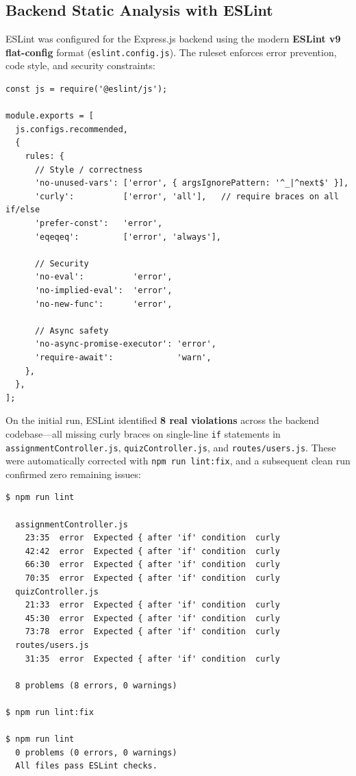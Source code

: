 \documentclass[12pt, a4paper]{report}
\begin{document}
\subsection{Backend Static Analysis with ESLint}
ESLint was configured for the Express.js backend using the modern \textbf{ESLint v9 flat-config} format (\texttt{eslint.config.js}). The ruleset enforces error prevention, code style, and security constraints:

\begin{lstlisting}[style=js_style, caption={Backend ESLint flat configuration (\texttt{backend/eslint.config.js})}]
const js = require('@eslint/js');

module.exports = [
  js.configs.recommended,
  {
    rules: {
      // Style / correctness
      'no-unused-vars': ['error', { argsIgnorePattern: '^_|^next$' }],
      'curly':          ['error', 'all'],   // require braces on all if/else
      'prefer-const':   'error',
      'eqeqeq':         ['error', 'always'],

      // Security
      'no-eval':          'error',
      'no-implied-eval':  'error',
      'no-new-func':      'error',

      // Async safety
      'no-async-promise-executor': 'error',
      'require-await':             'warn',
    },
  },
];
\end{lstlisting}

On the initial run, ESLint identified \textbf{8 real violations} across the backend codebase---all missing curly braces on single-line \texttt{if} statements in \texttt{assignmentController.js}, \texttt{quizController.js}, and \texttt{routes/users.js}. These were automatically corrected with \texttt{npm run lint:fix}, and a subsequent clean run confirmed zero remaining issues:

\begin{lstlisting}[style=output_style, caption={ESLint execution: errors found, auto-fixed, and verified clean}]
$ npm run lint

  assignmentController.js
    23:35  error  Expected { after 'if' condition  curly
    42:42  error  Expected { after 'if' condition  curly
    66:30  error  Expected { after 'if' condition  curly
    70:35  error  Expected { after 'if' condition  curly
  quizController.js
    21:33  error  Expected { after 'if' condition  curly
    45:30  error  Expected { after 'if' condition  curly
    73:78  error  Expected { after 'if' condition  curly
  routes/users.js
    31:35  error  Expected { after 'if' condition  curly

  8 problems (8 errors, 0 warnings)

$ npm run lint:fix

$ npm run lint
  0 problems (0 errors, 0 warnings)
  All files pass ESLint checks.
\end{lstlisting}
\end{document}
